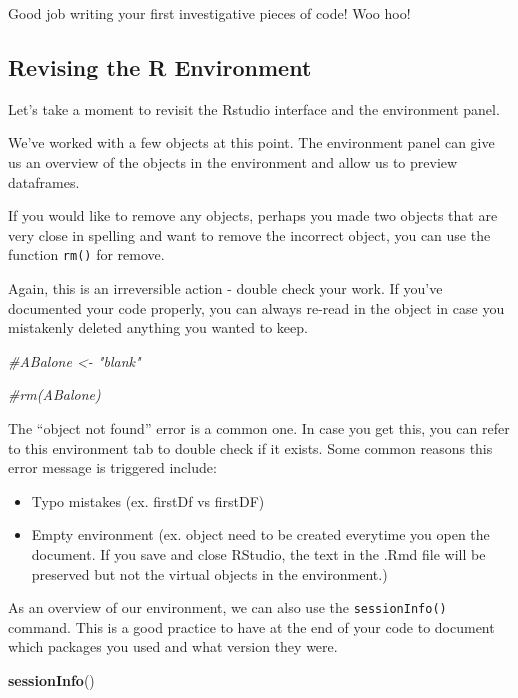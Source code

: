 \documentclass[
]{book}
\newenvironment{Shaded}{\begin{snugshade}}{\end{snugshade}}
\newcommand{\CommentTok}[1]{\textcolor[rgb]{0.56,0.35,0.01}{\textit{#1}}}
\newcommand{\FunctionTok}[1]{\textcolor[rgb]{0.13,0.29,0.53}{\textbf{#1}}}
\newcommand{\NormalTok}[1]{#1}
\providecommand{\tightlist}{%
  \setlength{\itemsep}{0pt}\setlength{\parskip}{0pt}}
\begin{document}
Good job writing your first investigative pieces of code! Woo hoo!

\subsection{Revising the R Environment}\label{revising-the-r-environment}

Let's take a moment to revisit the Rstudio interface and the environment panel.

We've worked with a few objects at this point. The environment panel can give us an overview of the objects in the environment and allow us to preview dataframes.

If you would like to remove any objects, perhaps you made two objects that are very close in spelling and want to remove the incorrect object, you can use the function \texttt{rm()} for remove.

Again, this is an irreversible action - double check your work. If you've documented your code properly, you can always re-read in the object in case you mistakenly deleted anything you wanted to keep.

\begin{Shaded}
\begin{Highlighting}[]
\CommentTok{\#ABalone \textless{}{-} "blank"}

\CommentTok{\#rm(ABalone)}
\end{Highlighting}
\end{Shaded}

The ``object not found'' error is a common one. In case you get this, you can refer to this environment tab to double check if it exists. Some common reasons this error message is triggered include:

\begin{itemize}
\tightlist
\item
  Typo mistakes (ex. firstDf vs firstDF)
\item
  Empty environment (ex. object need to be created everytime you open the document. If you save and close RStudio, the text in the .Rmd file will be preserved but not the virtual objects in the environment.)
\end{itemize}

As an overview of our environment, we can also use the \texttt{sessionInfo()} command. This is a good practice to have at the end of your code to document which packages you used and what version they were.

\begin{Shaded}
\begin{Highlighting}[]
\FunctionTok{sessionInfo}\NormalTok{()}
\end{Highlighting}
\end{Shaded}
\end{document}
